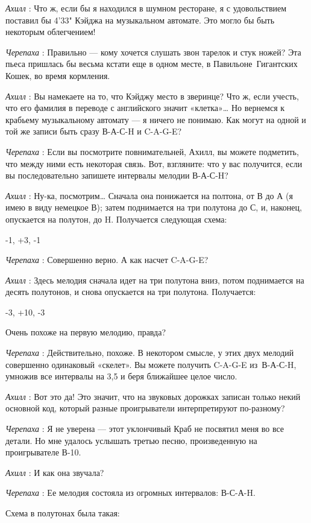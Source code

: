 \emph{Ахилл} : Что ж, если бы я находился в шумном ресторане, я с удовольствием поставил бы 4'33" Кэйджа на музыкальном автомате. Это могло бы быть некоторым облегчением!

\emph{Черепаха} : Правильно --- кому хочется слушать звон тарелок и стук ножей? Эта пьеса пришлась бы весьма кстати еще в одном месте, в Павильоне~Гигантских Кошек, во время кормления.

\emph{Ахилл} : Вы намекаете на то, что Кэйджу место в зверинце? Что ж, если учесть, что его фамилия в переводе с английского значит «клетка»\ldots{} Но вернемся к крабьему музыкальному автомату --- я ничего не понимаю. Как могут на одной и той же записи быть сразу В-А-С-H и C-A-G-E?

\emph{Черепаха} : Если вы посмотрите повнимательней, Ахилл, вы можете подметить, что между ними есть некоторая связь. Вот, взгляните: что у вас получится, если вы последовательно запишете интервалы мелодии В-А-С-H?

\emph{Ахилл} : Ну-ка, посмотрим\ldots{} Сначала она понижается на полтона, от В до А (я имею в виду немецкое В); затем поднимается на три полутона до С, и, наконец, опускается на полутон, до H. Получается следующая схема:

-1, +3, -1

\emph{Черепаха} : Совершенно верно. А как насчет C-A-G-E?

\emph{Ахилл} : Здесь мелодия сначала идет на три полутона вниз, потом поднимается на десять полутонов, и снова опускается на три полутона. Получается:

-3, +10, -3

Очень похоже на первую мелодию, правда?

\emph{Черепаха} : Действительно, похоже. В некотором смысле, у этих двух мелодий совершенно одинаковый «скелет». Вы можете получить C-A-G-E из~В-А-С-H, умножив все интервалы на 3,5 и беря ближайшее целое число.

\emph{Ахилл} : Вот это да! Это значит, что на звуковых дорожках записан только некий основной код, который разные проигрыватели интерпретируют по-разному?

\emph{Черепаха} : Я не уверена --- этот уклончивый Краб не посвятил меня во все детали. Но мне удалось услышать третью песню, произведенную на проигрывателе В-10.

\emph{Ахилл} : И как она звучала?

\emph{Черепаха} : Ее мелодия состояла из огромных интервалов: В-С-А-H.

Схема в полутонах была такая:

